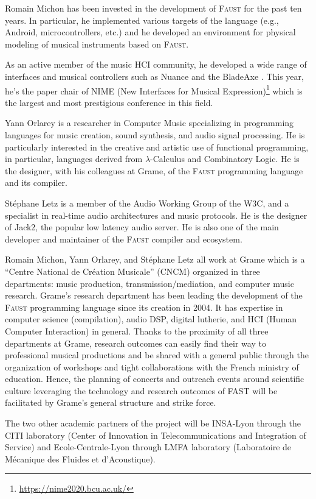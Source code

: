\documentclass[a4paper,9pt]{extarticle}
\newcommand{\F}{\textsc{Faust}}
\newcommand{\PP}{FAST}
\begin{document}
Romain Michon has been invested in the development of \F{} for the past ten years. In particular, he implemented various targets of the language (e.g., Android, microcontrollers, etc.) and he developed an environment for physical modeling of musical instruments based on \F{}.

As an active member of the music HCI community, he developed a wide range of interfaces and musical controllers such as Nuance \cite{Michon2016d} and the BladeAxe \cite{Michon2016}. This year, he's the paper chair of NIME (New Interfaces for Musical Expression)\footnote{\url{https://nime2020.bcu.ac.uk/}} which is the largest and most prestigious conference in this field.

Yann Orlarey is a researcher in Computer Music specializing in programming languages for music creation, sound synthesis, and audio signal processing. He is particularly interested in the creative and artistic use of functional programming, in particular, languages derived from $\lambda$-Calculus and Combinatory Logic. He is the designer, with his colleagues at Grame, of the \F{} programming language and its compiler. 

Stéphane Letz is a member of the Audio Working Group of the W3C, and a specialist in real-time audio architectures and music protocols. He is the designer of Jack2, the popular low latency audio server. He is also one of the main developer and maintainer of the \F{} compiler and ecosystem.

Romain Michon, Yann Orlarey, and Stéphane Letz all work at Grame which is a ``Centre National de Création Musicale'' (CNCM) organized in three departments: music production, transmission/mediation, and computer music research. Grame's research department has been leading the development of the \F{} programming language since its creation in 2004. It has expertise in computer science (compilation), audio DSP, digital lutherie, and HCI (Human Computer Interaction) in general. Thanks to the proximity of all three departments at Grame, research outcomes can easily find their way to professional musical productions and be shared with a general public through the organization of workshops and tight collaborations with the French ministry of education. Hence, the planning of concerts and outreach events around scientific culture leveraging the technology and research outcomes of \PP{} will be facilitated by Grame's general structure and strike force.

The two other academic partners of the project will be INSA-Lyon through the CITI laboratory (Center of Innovation in Telecommunications and Integration of Service) and Ecole-Centrale-Lyon through LMFA laboratory (Laboratoire de Mécanique des Fluides et d'Acoustique).
\end{document}
